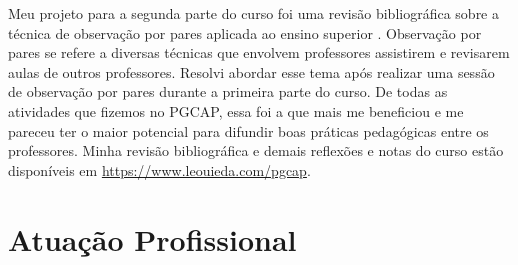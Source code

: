 \documentclass[10pt,a4paper,oneside]{book}
\begin{document}
Meu projeto para a segunda parte do curso foi uma revisão bibliográfica sobre
a técnica de observação por pares aplicada ao ensino superior
\citep{Cosh1998,Fletcher2018,OKeeffe2021}.
Observação por pares se refere a diversas técnicas que envolvem professores
assistirem e revisarem aulas de outros professores.
Resolvi abordar esse tema após realizar uma sessão de observação por pares
durante a primeira parte do curso.
De todas as atividades que fizemos no PGCAP, essa foi a que mais me beneficiou
e me pareceu ter o maior potencial para difundir boas práticas pedagógicas
entre os professores.
Minha revisão bibliográfica e demais reflexões e notas do curso estão
disponíveis em \url{https://www.leouieda.com/pgcap}.


\chapter{Atuação Profissional}
\label{cap_atuacao}
\end{document}
